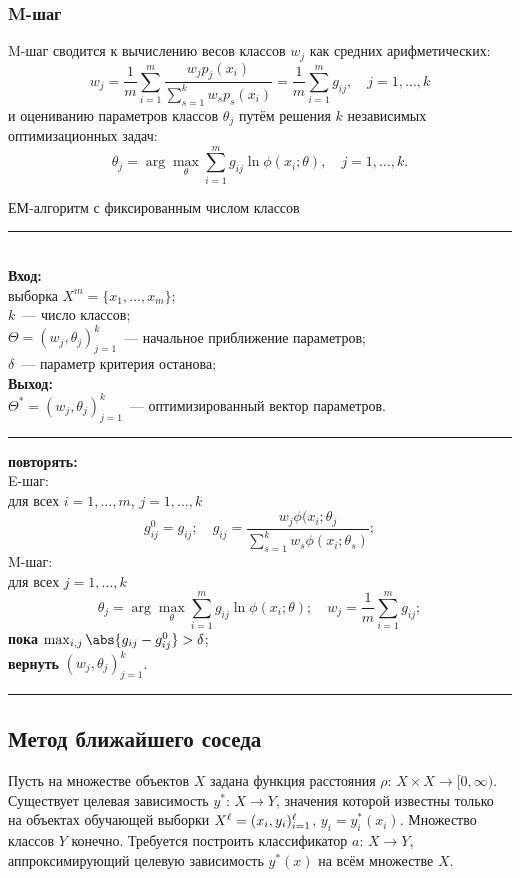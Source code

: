 \subsubsection{M-шаг}
M-шаг сводится к вычислению весов классов \( w_j \) как средних арифметических:
\begin{equation}
  w_j = \frac{1}{m}\sum_{i = 1}^m\frac{w_jp_j(x_i)}{\sum_{s = 1}^k w_sp_s(x_i)} =
  \frac{1}{m}\sum_{i = 1}^m g_{ij}, \quad j = 1, \ldots, k
  \label{2:19}
\end{equation}
и оцениванию параметров классов \( \theta_j \) путём решения \( k \) независимых оптимизационных
задач:
\begin{equation}
  \theta_j = \arg\max_\theta\sum_{i = 1}^m g_{ij}\ln\phi(x_i; \theta), \quad j = 1, \ldots, k.
  \label{2:20}
\end{equation}

ЕМ-алгоритм с фиксированным числом классов\\
\rule{\textwidth}{1pt}\\
\textbf{Вход:}\\
\indent выборка \( X^m = \{x_1,\ldots,x_m\} \);\\
\indent \( k \)~--- число классов;\\
\indent \( \Theta = (w_j, \theta_j)_{j = 1}^k \)~--- начальное приближение параметров;\\
\indent \( \delta \)~--- параметр критерия останова;\\
\textbf{Выход:}\\
\indent \( \Theta^* = (w_j, \theta_j)_{j = 1}^k \)~--- оптимизированный вектор параметров.\\
\rule{\textwidth}{.5pt}
\textbf{повторять:}\\
\indent E-шаг:\\
\indent для всех \( i = 1, \ldots, m \), \( j = 1, \ldots, k \)
\[
  g_{ij}^0 = g_{ij}; \quad g_{ij} = \frac{w_j\phi(x_i; \theta_j}{\sum_{s = 1}^kw_s\phi(x_i; \theta_s)};
\]
\indent M-шаг:\\
\indent для всех \( j = 1, \ldots, k \)
\[
  \theta_j = \arg\max_\theta\sum_{i = 1}^m g_{ij}\ln\phi(x_i; \theta); \quad w_j = \frac{1}{m}\sum_{i = 1}^m g_{ij};
\]
\textbf{пока} \( \max_{i, j}\abs{g_{ij} - g_{ij}^0} > \delta \);\\
\textbf{вернуть} \( (w_j, \theta_j)_{j = 1}^k \).\\
\rule{\textwidth}{1pt}

\subsection{Метод ближайшего соседа}
Пусть на множестве объектов \( X \) задана функция расстояния \( \rho \): \( X\times X\to [0, \infty) \).
Существует целевая зависимость \( y^* \): \( X\to Y \), значения которой известны только на объектах
обучающей выборки \( X^\ell = (x_i, y_i)_{i = 1}^\ell \), \( y_i = y_i^*(x_i) \). Множество классов \( Y \)
конечно. Требуется построить классификатор \( a \): \( X\to Y \), аппроксимирующий целевую зависимость
\( y^*(x) \) на всём множестве \( X \).

